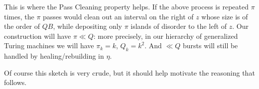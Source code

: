 \documentclass[11pt]{memoir}
\theoremstyle{definition} %
\def\B{B}
\newcommand{\passno}{\pi}
\newcommand{\Q}{Q}
\begin{document}
This is where the Pass Cleaning property helps.
If the above process is repeated \( \passno \) times, the \( \passno \) passes
would clean out an interval on the
right of \( z \) whose size is of the order of \( \Q\B \),
while depositing only \( \passno \) islands of disorder to the left of \( z \).
Our construction will have \( \passno\ll \Q \): more precisely, in our hierarchy
of generalized Turing machines we will have \( \passno_{k}=k \), \( \Q_{k}=k^{2} \). %
And \( \ll \Q \) bursts will still be handled by healing/rebuilding in \( \eta \).

Of course this sketch is very crude, but it should help motivate the reasoning that
follows.





\end{document}
